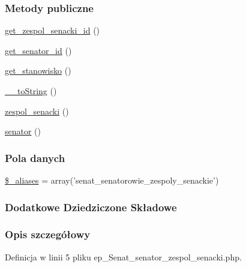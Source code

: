 \subsubsection*{Metody publiczne}
\begin{DoxyCompactItemize}
\item 
\hyperlink{classep___senat__senator__zespol__senacki_aebc00cea81bbc9249769237bbb71d38e}{get\-\_\-zespol\-\_\-senacki\-\_\-id} ()
\item 
\hyperlink{classep___senat__senator__zespol__senacki_aa0c141b1e9aba9fed3eb13ed8901de76}{get\-\_\-senator\-\_\-id} ()
\item 
\hyperlink{classep___senat__senator__zespol__senacki_a24e5fcbf4661581e53314bf23f908b7a}{get\-\_\-stanowisko} ()
\item 
\hyperlink{classep___senat__senator__zespol__senacki_a7516ca30af0db3cdbf9a7739b48ce91d}{\-\_\-\-\_\-to\-String} ()
\item 
\hyperlink{classep___senat__senator__zespol__senacki_af6439a809c6c1a83d25215a86e3f2090}{zespol\-\_\-senacki} ()
\item 
\hyperlink{classep___senat__senator__zespol__senacki_af076312b536f7707cda87563bd9113d9}{senator} ()
\end{DoxyCompactItemize}
\subsubsection*{Pola danych}
\begin{DoxyCompactItemize}
\item 
\hyperlink{classep___senat__senator__zespol__senacki_ab4e31d75f0bc5d512456911e5d01366b}{\$\-\_\-aliases} = array('senat\-\_\-senatorowie\-\_\-zespoly\-\_\-senackie')
\end{DoxyCompactItemize}
\subsubsection*{Dodatkowe Dziedziczone Składowe}


\subsubsection{Opis szczegółowy}


Definicja w linii 5 pliku ep\-\_\-\-Senat\-\_\-senator\-\_\-zespol\-\_\-senacki.\-php.



